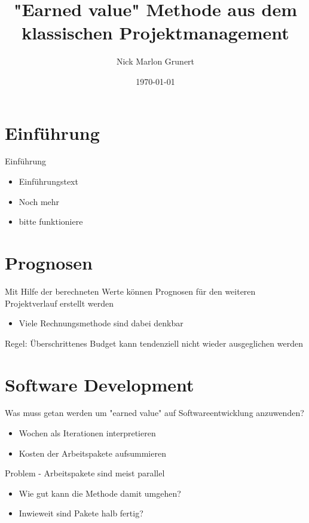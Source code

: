 \documentclass{f4_beamer}
\title{"Earned value" Methode aus dem klassischen Projektmanagement}
\author{Nick Marlon Grunert}
\date{\today}
\begin{document}
\section{Einführung}

\begin{frame}{Einführung}
    \begin{itemize}
        \item Einführungstext
        \item Noch mehr
        \item bitte funktioniere
    \end{itemize}
\end{frame}





\section{Prognosen}
\begin{frame}[fragile]
    Mit Hilfe der berechneten Werte können Prognosen für den weiteren Projektverlauf erstellt werden
    \begin{itemize}
        \item Viele Rechnungsmethode sind dabei denkbar
    \end{itemize}
    Regel: Überschrittenes Budget kann tendenziell nicht wieder ausgeglichen werden
\end{frame}


\section{Software Development}
\begin{frame}[fragile]
    Was muss getan werden um "earned value" auf Softwareentwicklung anzuwenden?
    \begin{itemize}
        \item Wochen als Iterationen interpretieren
        \item Kosten der Arbeitspakete aufsummieren
    \end{itemize}
\end{frame}
\begin{frame}[fragile]
    Problem - Arbeitspakete sind meist parallel
    \begin{itemize}
        \item Wie gut kann die Methode damit umgehen?
        \item Inwieweit sind Pakete halb fertig?
    \end{itemize}
\end{frame}
\end{document}
